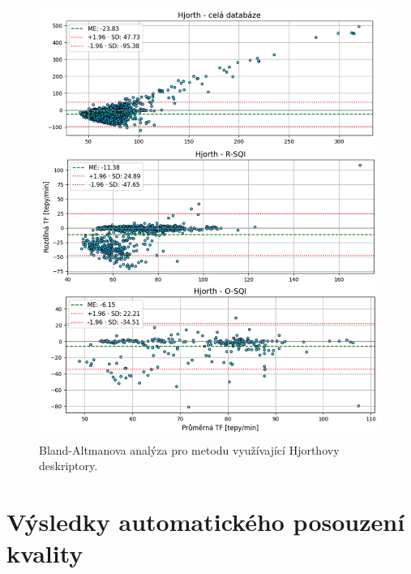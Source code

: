 \begin{figure}[!ht]
	\centering
	\includegraphics[width=1\textwidth]{./obrazky/vysledky/BA_BUT_Hjorth.png}
	\caption[Bland-Altmanova analýza pro metodu využívající Hjorthovy deskriptory - BUT PPG]{Bland-Altmanova analýza pro metodu využívající Hjorthovy deskriptory.}
	\label{fig:BUT_BlandAltman_hjorth}
\end{figure}

\FloatBarrier
\section{Výsledky automatického posouzení kvality}
\label{sec:vysledky_kvalita}